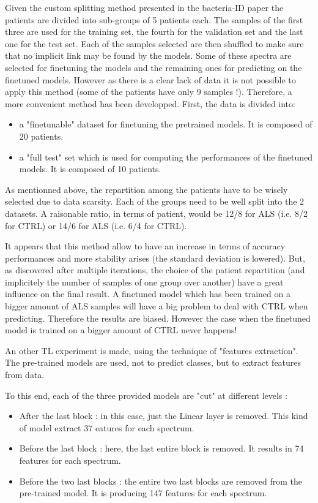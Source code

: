 Given the custom splitting method presented in the bacteria-ID paper\cite{bacteria-ID} the patients are divided into sub-groups of 5 patients each. The samples of the first three are used for the training set, the fourth for the validation set and the last one for the test set. Each of the samples selected are then shuffled to make sure that no implicit link may be found by the models. Some of these spectra are selected for finetuning the models and the remaining ones for predicting on the finetuned models.
However as there is a clear lack of data it is not possible to apply this method (some of the patients have only 9 samples !).
Therefore, a more convenient method has been developped. First, the data is divided into:
\begin{itemize}
\item a "finetunable" dataset for finetuning the pretrained models. It is composed of 20 patients.
\item a "full test" set which is used for computing the performances of the finetuned models. It is composed of 10 patients.
\end{itemize}  
As mentionned above, the repartition among the patients have to be wisely selected due to data scarsity. Each of the groups need to be well split into the 2 datasets. 
A raisonable ratio, in terms of patient, would be 12/8 for ALS (i.e. 8/2 for CTRL) or 14/6 for ALS (i.e. 6/4 for CTRL). 

It appears that this method allow to have an increase in terms of accuracy performances and more stability arises (the standard deviation is lowered). But, as discovered after multiple iterations, the choice of the patient repartition (and implicitely the number of samples of one group over another) have a great influence on the final result.
A finetuned model which has been trained on a bigger amount of ALS samples will have a big problem to deal with CTRL when predicting. Therefore the results are biased. 
However the case when the finetuned model is trained on a bigger amount of CTRL never happens!

An other TL experiment is made, using the technique of "features extraction". The pre-trained models are used, not to predict classes, but to extract features from data. 

To this end, each of the three provided models are "cut" at different levels :
\begin{itemize}
\item After the last block : in this case, just the Linear layer is removed. This kind of model extract 37 eatures for each spectrum.
\item Before the last block : here, the last entire block is removed. It results in 74 features for each spectrum.
\item Before the two last blocks : the entire two last blocks are removed from the pre-trained model. It is producing 147 features for each spectrum.
\end{itemize}

